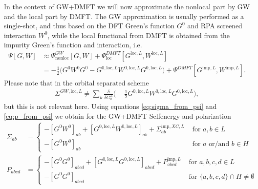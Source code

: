 \documentclass[12pt,a4paper]{scrartcl}
\numberwithin{equation}{section}
\begin{document}
In the context of GW+DMFT we will now approximate the nonlocal part by GW and the local part
by DMFT. The GW approximation is usually performed as a single-shot, and thus
based on the DFT Green's function $G^0$ and RPA screened interaction $W^0$,
while the local functional from DMFT is obtained from the impurity Green's function and
interaction, i.e.
\begin{align}
\Psi[G,W] &\approx \Psi^{GW}_{\mathrm{nonloc}}[G,W] + \Psi^{DMFT}_{\mathrm{loc}}[G^{\mathrm{loc},L},W^{\mathrm{loc},L}] \\
&= -\frac{1}{2}\Big( G^0W^0G^0 - G^{0,\mathrm{loc},L}W^{0,\mathrm{loc},L}G^{0,\mathrm{loc},L}  \Big)
                    + \Psi^{DMFT}[G^{\mathrm{imp},L},W^{\mathrm{imp},L}] .
\end{align}
Please note that in the orbital separated scheme 
\begin{align}
 \Sigma^{GW,\mathrm{loc},L} \neq \sum_k \frac{\delta}{\delta G^L_k}
             \Big( -\frac{1}{2} G^{0,\mathrm{loc},L}W^{0,\mathrm{loc},L}G^{0,\mathrm{loc},L} \Big),
\end{align}
but this is not relevant here.
Using equations \eqref{eq:sigma_from_psi} and \eqref{eq:p_from_psi} we obtain for the GW+DMFT
Selfenergy and polarization
\begin{align}
\Sigma_{ab} &= 
\begin{cases}
-[G^0W^0]_{ab} + [G^{0,\mathrm{loc},L}W^{0,\mathrm{loc},L}]_{ab}+ \Sigma_{ab}^{\mathrm{imp},XC,L} & \mbox{ for } a,b \in L  \\
-[G^0W^0]_{ab}                                                                      & \mbox{ for } a \mbox{ or/and } b \in H 
\end{cases}\\
%
%
P_{abcd} &= 
\begin{cases}
-[G^0G^0]_{abcd} + [G^{0,\mathrm{loc},L}G^{0,\mathrm{loc},L}]_{abcd}+ P_{abcd}^{\mathrm{imp},L} & \mbox{ for } a,b,c,d \in L  \\
-[G^0G^0]_{abcd}                                                                      & \mbox{ for } \{a,b,c,d\} \cap H  \neq \emptyset
\end{cases}
\end{align}
\end{document}
